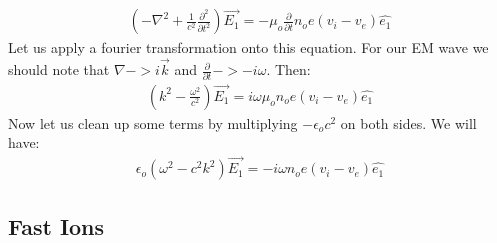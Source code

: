 \documentclass[11pt]{article}
\theoremstyle{quest}
\newcommand{\Prdf}[2]{\frac{\partial #1}{\partial #2}}
\newcommand{\ScPrdf}[2]{\frac{\partial^2 #1}{\partial #2^2}}
\begin{document}
\begin{align}
	\left(-\nabla^2 + \frac{1}{c^2}\ScPrdf{}{t}\right) \vec{E_1} = -\mu_o \Prdf{}{t}n_o e \left(v_i - v_e \right) \hat{e_1}
\end{align}
Let us apply a fourier transformation onto this equation. For our EM wave we should note that $\nabla -> i\vec{k}$ and $\Prdf{}{t} -> -i\omega$. Then:
\begin{align}
\left(k^2 - \frac{\omega^2}{c^2}\right) \vec{E_1} = i \omega\mu_o n_o e \left(v_i - v_e \right) \hat{e_1}
\end{align}
Now let us clean up some terms by multiplying $-\epsilon_o c^2$ on both sides. We will have: 
\begin{align}
\epsilon_o \left(\omega^2 - c^2 k^2\right) \vec{E_1} = -i \omega n_o e \left(v_i - v_e \right) \hat{e_1}
\end{align}
\subsection{Fast Ions}
\end{document}
